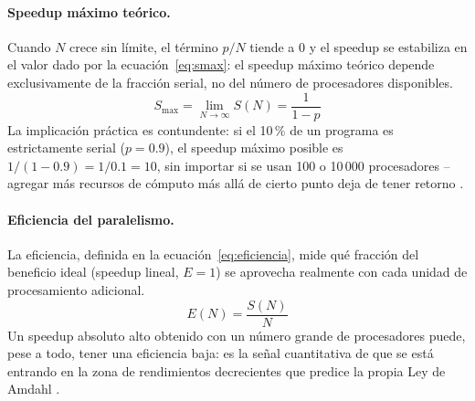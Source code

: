 \documentclass[11pt,a4paper]{article}
\begin{document}
\paragraph{Speedup m\'aximo te\'orico.}
Cuando $N$ crece sin l\'imite, el t\'ermino $p/N$ tiende a 0 y el speedup se
estabiliza en el valor dado por la ecuaci\'on~\eqref{eq:smax}: el speedup
m\'aximo te\'orico depende exclusivamente de la fracci\'on serial, no del
n\'umero de procesadores disponibles.
\begin{equation}
S_{\max} = \lim_{N\to\infty} S(N) = \frac{1}{1-p}
\label{eq:smax}
\end{equation}
La implicaci\'on pr\'actica es contundente: si el 10\,\% de un programa es
estrictamente serial ($p=0.9$), el speedup m\'aximo posible es
$1/(1-0.9)=1/0.1=10$, sin importar si se usan 100 o 10\,000 procesadores
--agregar m\'as recursos de c\'omputo m\'as all\'a de cierto punto deja de
tener retorno \cite{amdahl1967,gustafson1988}.

\paragraph{Eficiencia del paralelismo.}
La eficiencia, definida en la ecuaci\'on~\eqref{eq:eficiencia}, mide qu\'e
fracci\'on del beneficio ideal (speedup lineal, $E=1$) se aprovecha realmente
con cada unidad de procesamiento adicional.
\begin{equation}
E(N) = \frac{S(N)}{N}
\label{eq:eficiencia}
\end{equation}
Un speedup absoluto alto obtenido con un n\'umero grande de procesadores
puede, pese a todo, tener una eficiencia baja: es la se\~nal cuantitativa de
que se est\'a entrando en la zona de rendimientos decrecientes que predice la
propia Ley de Amdahl \cite{amdahl1967,chambers2018}.
\end{document}
